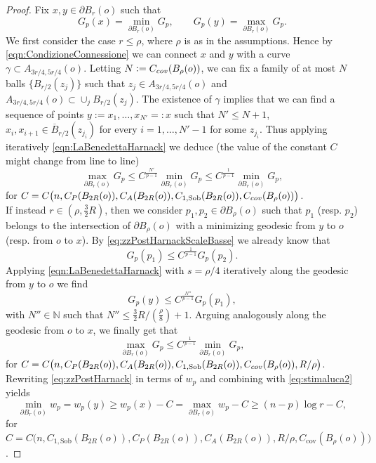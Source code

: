 \documentclass[a4paper,12pt,reqno]{amsart}
\numberwithin{equation}{section}
\theoremstyle{plain}
\theoremstyle{definition}
\theoremstyle{remark}
\newcommand{\N}{\mathbb{N}}
\newcommand{\eqdef}{\ensuremath{\vcentcolon=}}
\begin{document}
{\begin{proof}
Fix $x, y \in \partial B_r(o)$ such that
\[
G_p(x) = \min_{\partial B_r(o)} G_p,
\qquad
G_p(y) = \max_{\partial B_r(o)} G_p.
\]
We first consider the case $r \le\rho$, where $\rho$ is as in the assumptions. Hence by \eqref{eqn:CondizioneConnessione} we can connect $x$ and $y$ with a curve $\gamma\subset A_{3r/4,5r/4}(o)$. Letting $N\eqdef C_{\rm cov}(B_\rho(o))$, we can fix a family of at most $N$ balls $\{ B_{r/2}(z_j)\}$ such that $z_j \in A_{3r/4,5r/4}(o)$ and $A_{3r/4,5r/4}(o) \subset \cup_j  B_{r/2}(z_j)$. The existence of $\gamma$ implies that we can find a sequence of points $y:=x_1,\ldots,x_{N'}=:x$ such that $N' \le N+1$, $x_i,x_{i+1}\in \overline{B}_{r/2}(z_{j_i})$ for every $i=1,\ldots,N'-1$ for some $z_{j_i}$. Thus applying iteratively \eqref{eqn:LaBenedettaHarnack} we deduce (the value of the constant $C$ might change from line to line)
\begin{equation}\label{eq:zzPostHarnackScaleBasse}
    \max_{\partial B_r(o)} G_p \le C^{\frac{N'}{p-1}} \min_{\partial B_r(o)} G_p \le C^{\frac{1}{p-1}} \min_{\partial B_r(o)} G_p,
\end{equation}
for $C=C\big(n, C_P(B_{2R}(o)), C_A(B_{2R}(o)), C_{1, \mathrm{Sob}}(B_{2R}(o)), C_{\rm cov}(B_\rho(o)) \big)$.\\
If instead $r \in (\rho, \tfrac32 R)$, then we consider $p_1, p_2 \in \partial B_\rho(o)$ such that $p_1$ (resp. $p_2$) belongs to the intersection of $\partial B_\rho(o)$ with a minimizing geodesic from $y$ to $o$ (resp. from $o$ to $x$). By \eqref{eq:zzPostHarnackScaleBasse} we already know that
\[
G_p(p_1) \le C^{\frac{1}{p-1}} G_p(p_2).
\]
Applying \eqref{eqn:LaBenedettaHarnack} with $s=\rho/4$ iteratively along the geodesic from $y$ to $o$ we find
\[
G_p(y) \le  C^{\frac{N''}{p-1}}  G_p (p_1),
\]
with $N'' \in \N$ such that $N''\le \tfrac32 R / (\tfrac{\rho}{8}) +1$. Arguing analogously along the geodesic from $o$ to $x$, we finally get that
\begin{equation}\label{eq:zzPostHarnack}
    \max_{\partial B_r(o)} G_p \le C^{\frac{1}{p-1}} \min_{\partial B_r(o)} G_p,
\end{equation}
for $C=C\big( n, C_P(B_{2R}(o)), C_A(B_{2R}(o)), C_{1, \mathrm{Sob}}(B_{2R}(o)), C_{\rm cov}(B_\rho(o)) , R/\rho\big)$.
Rewriting \eqref{eq:zzPostHarnack} in terms of $w_p$ and combining with \eqref{eq:stimaluca2} yields
\[
\min_{\partial B_r(o)} w_p = w_p(y) \ge w_p(x) - C = \max_{\partial B_r(o)} w_p - C
\ge (n-p)\log r - C,
\]
for $C=C\big(n, C_{1, \mathrm{Sob}}(B_{2R}(o)), C_P(B_{2R}(o)), C_A(B_{2R}(o)), R/\rho, C_{\mathrm{cov}}(B_\rho(o))\big)$.
\end{proof}

}
\end{document}
